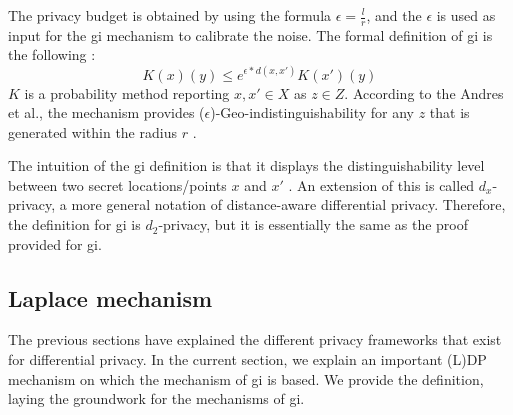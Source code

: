 The privacy budget is obtained by using the formula $\epsilon = \frac{l}{r}$, and the $\epsilon$ is used as input for the \gls{gi} mechanism to calibrate the noise. \newline
The formal definition of \gls{gi} is the following \citep{DBLP:journals/corr/abs-1212-1984}:
\begin{equation}
  K(x)(y) \le e^{\epsilon * d(x,x')} K(x')(y)
  \label{algo:2d-geo-indistinguishability}
\end{equation}
$K$ is a probability method reporting $x, x' \in X$ as $z \in Z$.
According to the Andres et al., the mechanism provides ($\epsilon$)-Geo-indistinguishability for any $z$ that is generated within the radius $r$ \citep{DBLP:journals/corr/abs-1212-1984}.

The intuition of the \gls{gi} definition is that it displays the distinguishability level between two secret locations/points $x$ and $x'$ \citep{chatzikokolakis_constructing_2015}.
An extension of this is called $d_x$-privacy, a more general notation of distance-aware differential privacy.
Therefore, the definition for \gls{gi} is $d_2$-privacy, but it is essentially the same as the proof provided for \gls{gi}.
\subsection{Laplace mechanism} \label{theory:laplace}
The previous sections have explained the different privacy frameworks that exist for differential privacy.
In the current section, we explain an important (L)DP mechanism on which the mechanism of \gls{gi} is based.
We provide the definition, laying the groundwork for the mechanisms of \gls{gi}.

